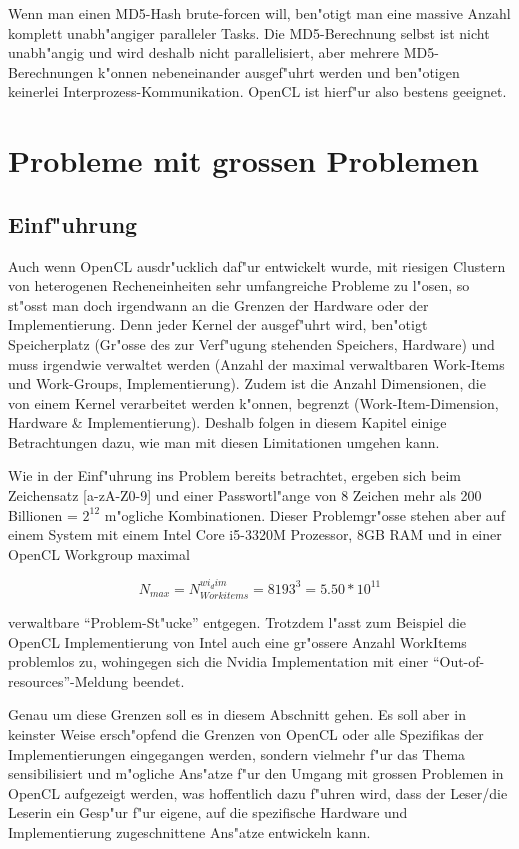 \begin{refsection}
Wenn man einen MD5-Hash brute-forcen will, ben"otigt man eine massive Anzahl
komplett unabh"angiger paralleler Tasks. Die MD5-Berechnung selbst ist nicht
unabh"angig und wird deshalb nicht parallelisiert, aber mehrere MD5-Berechnungen
k"onnen nebeneinander ausgef"uhrt werden und ben"otigen keinerlei
Interprozess-Kommunikation. OpenCL ist hierf"ur also bestens geeignet.

\section{Probleme mit grossen Problemen}
\label{crypto:grosse_probleme}

\subsection{Einf"uhrung}

Auch wenn OpenCL ausdr"ucklich daf"ur entwickelt wurde, mit riesigen Clustern
von heterogenen Recheneinheiten sehr umfangreiche Probleme zu l"osen, so st"osst
man doch irgendwann an die Grenzen der Hardware oder der Implementierung.  Denn
jeder Kernel der ausgef"uhrt wird, ben"otigt Speicherplatz (Gr"osse des zur
Verf"ugung stehenden Speichers, Hardware) und muss irgendwie verwaltet werden
(Anzahl der maximal verwaltbaren Work-Items und Work-Groups, Implementierung).
Zudem ist die Anzahl Dimensionen, die von einem Kernel verarbeitet werden k"onnen,
begrenzt (Work-Item-Dimension, Hardware \& Implementierung). Deshalb folgen in
diesem Kapitel einige Betrachtungen dazu, wie man mit diesen Limitationen
umgehen kann.

Wie in der Einf"uhrung ins Problem bereits betrachtet, ergeben sich beim Zeichensatz
[a-zA-Z0-9] und einer Passwortl"ange von 8 Zeichen mehr als 200 Billionen = $2^{12}$ 
m"ogliche Kombinationen. Dieser Problemgr"osse stehen aber auf einem System mit einem 
Intel Core i5-3320M Prozessor, 8GB RAM und in einer OpenCL Workgroup maximal

\[
 N_{max} = N_{Workitems}^{wi_dim} = 8193^{3} = 5.50 * 10^{11}
\]

verwaltbare ``Problem-St"ucke'' entgegen. Trotzdem l"asst zum Beispiel die OpenCL
Implementierung von Intel auch eine gr"ossere Anzahl WorkItems problemlos zu, 
wohingegen sich die Nvidia Implementation mit einer ``Out-of-resources''-Meldung 
beendet.

Genau um diese Grenzen soll es in diesem Abschnitt gehen. Es soll aber in keinster
Weise ersch"opfend die Grenzen von OpenCL oder alle Spezifikas der 
Implementierungen eingegangen werden, sondern vielmehr f"ur das Thema sensibilisiert 
und m"ogliche Ans"atze f"ur den Umgang mit grossen Problemen in OpenCL aufgezeigt
werden, was hoffentlich dazu f"uhren wird, dass der Leser/die Leserin ein Gesp"ur 
f"ur eigene, auf die spezifische Hardware und Implementierung zugeschnittene 
Ans"atze entwickeln kann.



\end{refsection}
